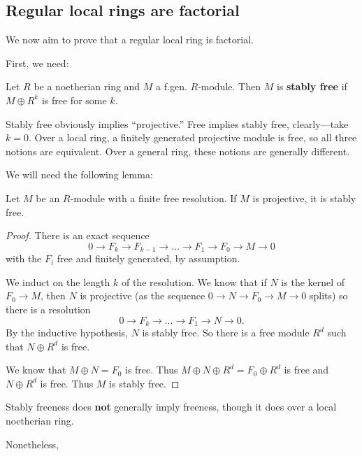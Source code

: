 \subsection{Regular local rings are factorial}

We now aim to prove that a regular local ring is factorial.

First, we need:
\begin{definition} 
Let $R$ be a noetherian ring and $M$ a f.gen. $R$-module.  Then $M$ is
\textbf{stably free} if $M \oplus R^k$ is free for some $k$.
\end{definition} 

Stably free obviously implies ``projective.'' 
Free implies stably free, clearly---take $k=0$. Over a local ring, a finitely
generated projective module is free, so all three notions are equivalent. Over a
general ring, these notions are generally different.

We will need the following lemma:

\begin{lemma} 
Let $M$ be an $R$-module with a finite free resolution. If $M$ is projective,
it is stably free.
\end{lemma} 
\begin{proof} 
There is an exact sequence
\[ 0 \to F_k \to F_{k-1} \to \dots \to F_1 \to F_0 \to M \to 0  \]
with the $F_i$ free and finitely generated, by assumption. 

We induct on the length $k$ of the resolution. We know that if $N$ is the
kernel of $F_0 \to M$, then $N$ is projective (as the sequence $0 \to N \to
F_0 \to M \to 0$ splits) so there is a resolution
\[ 0 \to F_k \to \dots \to F_1 \to N \to 0.  \]
By the inductive hypothesis, $N$ is stably free. 
So there is a free module $R^d$ such that $N \oplus R^d$ is free.

We know that $M \oplus N=F_0$ is
free. Thus $M \oplus N \oplus R^d = F_0 \oplus R^d$ is free and $N \oplus R^d$
is free. Thus $M$ is stably free.
\end{proof} 


\begin{remark} 
Stably freeness does \textbf{not} generally imply freeness, though it does
over a local noetherian ring.
\end{remark} 

Nonetheless,

